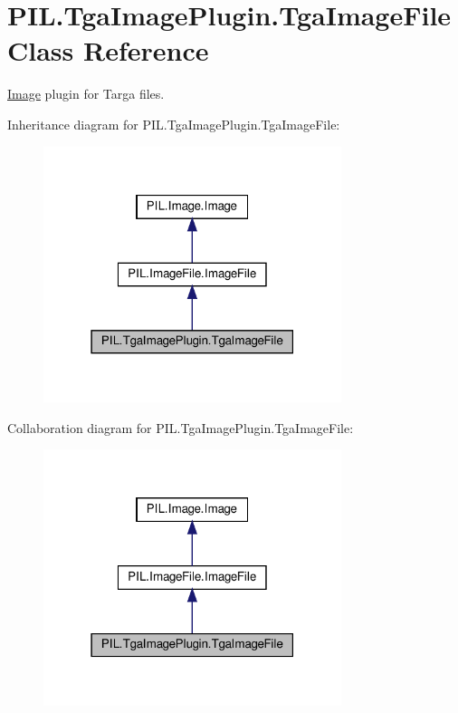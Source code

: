 \hypertarget{classPIL_1_1TgaImagePlugin_1_1TgaImageFile}{}\section{P\+I\+L.\+Tga\+Image\+Plugin.\+Tga\+Image\+File Class Reference}
\label{classPIL_1_1TgaImagePlugin_1_1TgaImageFile}


\hyperlink{namespacePIL_1_1Image}{Image} plugin for Targa files.  




Inheritance diagram for P\+I\+L.\+Tga\+Image\+Plugin.\+Tga\+Image\+File\+:
\nopagebreak
\begin{figure}[H]
\begin{center}
\leavevmode
\includegraphics[width=247pt]{classPIL_1_1TgaImagePlugin_1_1TgaImageFile__inherit__graph}
\end{center}
\end{figure}


Collaboration diagram for P\+I\+L.\+Tga\+Image\+Plugin.\+Tga\+Image\+File\+:
\nopagebreak
\begin{figure}[H]
\begin{center}
\leavevmode
\includegraphics[width=247pt]{classPIL_1_1TgaImagePlugin_1_1TgaImageFile__coll__graph}
\end{center}
\end{figure}
